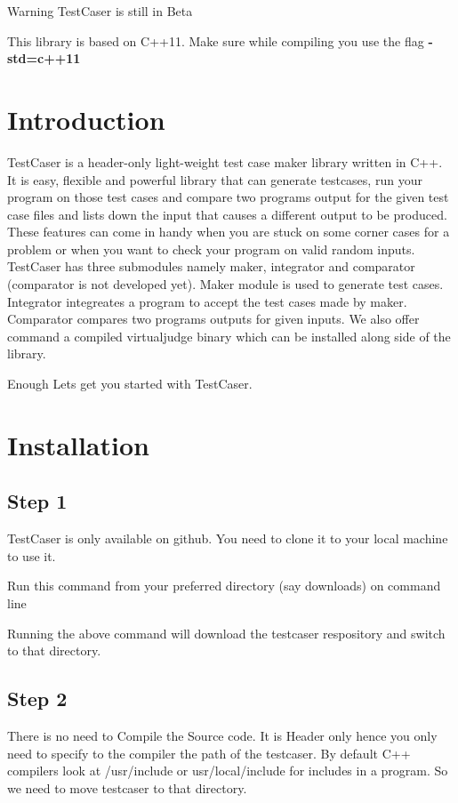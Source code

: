 \begin{DoxyWarning}{Warning}
Test\+Caser is still in Beta

This library is based on C++11. Make sure while compiling you use the flag {\bfseries{-\/std=c++11}}
\end{DoxyWarning}
\hypertarget{index_sec_intro}{}\section{Introduction}\label{index_sec_intro}
Test\+Caser is a header-\/only light-\/weight test case maker library written in C++. It is easy, flexible and powerful library that can generate testcases, run your program on those test cases and compare two program\textquotesingle{}s output for the given test case files and lists down the input that causes a different output to be produced. These features can come in handy when you are stuck on some corner cases for a problem or when you want to check your program on valid random inputs. Test\+Caser has three submodules namely maker, integrator and comparator (comparator is not developed yet). Maker module is used to generate test cases. Integrator integreates a program to accept the test cases made by maker. Comparator compares two program\textquotesingle{}s outputs for given inputs. We also offer command a compiled virtualjudge binary which can be installed along side of the library.

Enough Let\textquotesingle{}s get you started with Test\+Caser. 

\hypertarget{index_sec_install}{}\section{Installation}\label{index_sec_install}
\hypertarget{index_step1}{}\subsection{Step 1}\label{index_step1}
Test\+Caser is only available on github. You need to clone it to your local machine to use it.

Run this command from your preferred directory (say downloads) on command line 
\begin{DoxyCode}{0}
\end{DoxyCode}
 Running the above command will download the testcaser respository and switch to that directory.\hypertarget{index_step2}{}\subsection{Step 2}\label{index_step2}
There is no need to Compile the Source code. It is Header only hence you only need to specify to the compiler the path of the testcaser. By default C++ compilers look at {\ttfamily /usr/include} or {\ttfamily usr/local/include} for includes in a program. So we need to move testcaser to that directory.

